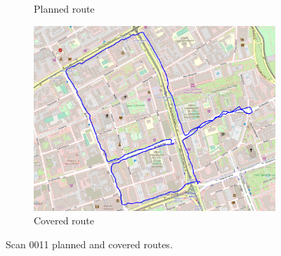\documentclass[a4paper,12pt]{article}
\begin{document}
\begin{enumerate}
\begin{figure}[H]
\begin{subfigure}{.88\textwidth}
			\caption{Planned route}
			\label{fig:a11}
		\end{subfigure}%
		\linebreak
		\begin{subfigure}{.88\textwidth}
			\centering
			\includegraphics[width=1\linewidth]{route_c11}
			\caption{Covered route}
			\label{fig:b11}
		\end{subfigure}
		\caption{Scan 0011 planned and covered routes.}
		\label{fig:fig11}
	\end{figure} 
\end{enumerate}
\end{document}
